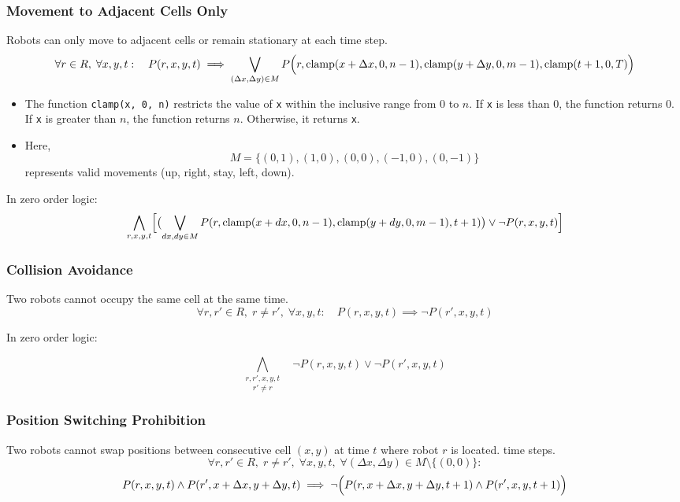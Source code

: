 \documentclass[8pt]{article}
\begin{document}
\subsubsection{Movement to Adjacent Cells Only}
Robots can only move to adjacent cells or remain stationary at each time step.
\[
    \forall r \in R,\; \forall x,y,t:\quad P(r,x,y,t) \implies \bigvee_{(\Delta x, \Delta y) \in M} P\Bigl(r,\text{clamp}(x+\Delta x,0,n-1),\text{clamp}(y+\Delta y,0,m-1),\text{clamp}(t+1,0,T)\Bigr)
\]
\begin{itemize}
    \item The function \texttt{clamp(x, 0, n)} restricts the value of \texttt{x} within the inclusive range from $0$ to $n$. If \texttt{x} is less than $0$, the function returns $0$. If \texttt{x} is greater than $n$, the function returns $n$. Otherwise, it returns \texttt{x}.
    \item Here, 
    \[
    M = \{(0, 1), (1, 0), (0, 0), (-1, 0), (0, -1)\}
    \]
    represents valid movements (up, right, stay, left, down).
\end{itemize}

In zero order logic:
\[
    \bigwedge_{r,x,y,t} \Bigl[ \bigl(\bigvee_{dx,dy \in M} P(r,\text{clamp}(x+dx,0,n-1),\text{clamp}(y+dy,0,m-1),t+1)\bigr) \lor \neg P(r,x,y,t) \Bigr]
\]

\subsubsection{Collision Avoidance}
Two robots cannot occupy the same cell at the same time.
\[
\forall r,r' \in R,\; r \neq r',\; \forall x,y,t:\quad P(r,x,y,t) \implies \neg P(r',x,y,t)
\]

In zero order logic:

%

\[
    \underset{r' \neq r}{\bigwedge_{r,r',x,y,t}} \quad \neg P(r,x,y,t) \lor \neg P(r',x,y,t)
\]


\subsubsection{Position Switching Prohibition}
Two robots cannot swap positions between consecutive cell $(x,y)$ at time $t$ where robot $r$ is located.
time steps.
\[
\forall r,r' \in R,\; r \neq r',\; \forall x,y,t,\; \forall (\Delta x,\Delta y) \in M \setminus \{(0,0)\}:
\]
\[
P(r,x,y,t) \wedge P(r',x+\Delta x,y+\Delta y,t) \implies \neg \Bigl(P(r,x+\Delta x,y+\Delta y,t+1) \wedge P(r',x,y,t+1)\Bigr)
\]
\end{document}

